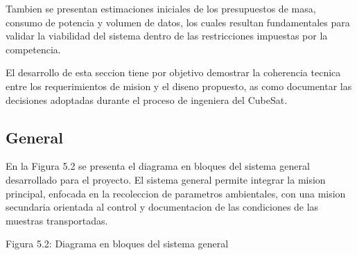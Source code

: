 Tambien se presentan estimaciones iniciales de los presupuestos de masa, consumo de
potencia y volumen de datos, los cuales resultan fundamentales para validar la viabilidad del
sistema dentro de las restricciones impuestas por la competencia.

El desarrollo de esta seccion tiene por objetivo demostrar la coherencia tecnica entre los
requerimientos de mision y el diseno propuesto, as como documentar las decisiones adoptadas
durante el proceso de ingeniera del CubeSat.

  \subsection{General}
    En la Figura 5.2 se presenta el diagrama en bloques del sistema general desarrollado para
    el proyecto.
    El sistema general permite integrar la mision principal, enfocada en la recoleccion de
    parametros ambientales, con una mision secundaria orientada al control y documentacion de
    las condiciones de las muestras transportadas.

    Figura 5.2: Diagrama en bloques del sistema general

